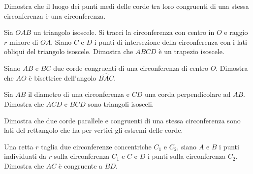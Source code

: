 \begin{multicols}{2}

\begin{esercizio}
\label{ese:5.6}
Dimostra che il luogo dei punti medi delle corde tra loro congruenti 
di una stessa circonferenza è una circonferenza.
\end{esercizio}

\begin{esercizio}
\label{ese:5.8}
Sia \(OAB\) un triangolo isoscele. Si tracci la circonferenza con 
centro in \(O\) e raggio \(r\) minore di \(OA\). Siano \(C\) e \(D\) i punti di 
intersezione della circonferenza con i lati obliqui del triangolo 
isoscele. Dimostra che \(ABCD\) è un trapezio isoscele.
\end{esercizio}

\begin{esercizio}
\label{ese:5.9}
Siano \(AB\) e \(BC\) due corde congruenti di una circonferenza di centro 
\(O\). Dimostra che \(AO\) è bisettrice dell'angolo \(B\widehat{A}C\).
\end{esercizio}


\begin{esercizio}
\label{ese:5.18}
Sia \(AB\) il diametro di una circonferenza e \(CD\) una corda 
perpendicolare ad \(AB\). Dimostra che \(ACD\) e \(BCD\) sono triangoli 
isosceli.
\end{esercizio}

\begin{esercizio}
\label{ese:5.19}
Dimostra che due corde parallele e congruenti di una stessa 
circonferenza sono lati del rettangolo che ha per vertici gli estremi 
delle corde.
\end{esercizio}



\begin{esercizio}
\label{ese:5.22}
Una retta \(r\) taglia due circonferenze concentriche \(C_1\) e \(C_2\), 
siano \(A\) e \(B\) i punti individuati da \(r\) sulla circonferenza \(C_1\) 
e \(C\) e \(D\) i punti sulla circonferenza \(C_2\). Dimostra che \(AC\) è 
congruente a \(BD\).
\end{esercizio}


\end{multicols}
